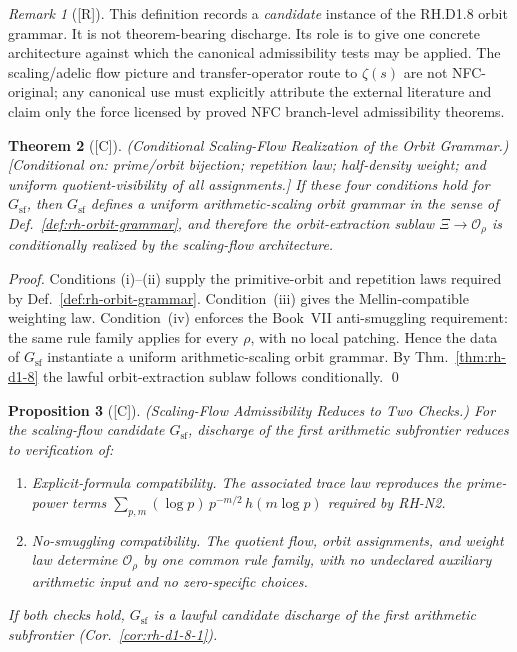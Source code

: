 \documentclass[12pt,oneside]{amsbook}
\theoremstyle{plain}
\newtheorem{theorem}{Theorem}[section]
\newtheorem{proposition}[theorem]{Proposition}
\theoremstyle{definition}
\theoremstyle{remark}
\newtheorem{remark}[theorem]{Remark}
\newcommand{\status}[1]{\textup{[#1]}}
\begin{document}
\begin{remark}[\status{R}]\label{rem:rh-sf-candidate-status}
This definition records a \emph{candidate} instance of the RH.D1.8
orbit grammar. It is not theorem-bearing discharge. Its role is to
give one concrete architecture against which the canonical
admissibility tests may be applied. The scaling/adelic flow picture
and transfer-operator route to $\zeta(s)$ are not NFC-original; any
canonical use must explicitly attribute the external literature and
claim only the force licensed by proved NFC branch-level admissibility
theorems.
\end{remark}

\begin{theorem}[\status{C}]\label{thm:rh-og-1}
\textup{(Conditional Scaling-Flow Realization of the Orbit Grammar.)}
\textup{[Conditional on: prime/orbit bijection; repetition law;
half-density weight; and uniform quotient-visibility of all
assignments.]}
If these four conditions hold for $G_{\mathrm{sf}}$, then
$G_{\mathrm{sf}}$ defines a uniform arithmetic-scaling orbit grammar in
the sense of Def.~\ref{def:rh-orbit-grammar}, and therefore the
orbit-extraction sublaw $\Xi \to \mathcal{O}_\rho$ is conditionally
realized by the scaling-flow architecture.
\end{theorem}

\begin{proof}
Conditions (i)--(ii) supply the primitive-orbit and repetition laws
required by Def.~\ref{def:rh-orbit-grammar}. Condition~(iii) gives
the Mellin-compatible weighting law. Condition~(iv) enforces the
Book~VII anti-smuggling requirement: the same rule family applies for
every $\rho$, with no local patching. Hence the data of $G_{\mathrm{sf}}$
instantiate a uniform arithmetic-scaling orbit grammar.
By Thm.~\ref{thm:rh-d1-8} the lawful orbit-extraction sublaw follows
conditionally. \qed
\end{proof}

\begin{proposition}[\status{C}]\label{prop:rh-og-2}
\textup{(Scaling-Flow Admissibility Reduces to Two Checks.)}
For the scaling-flow candidate $G_{\mathrm{sf}}$, discharge of the
first arithmetic subfrontier reduces to verification of:
\begin{enumerate}[label=\textup{(\arabic*)}]
 \item \emph{Explicit-formula compatibility.} The associated
 trace law reproduces the prime-power terms
 $\sum_{p,m} (\log p)\,p^{-m/2}\,h(m\log p)$ required by
 RH-N2.
 \item \emph{No-smuggling compatibility.} The quotient flow,
 orbit assignments, and weight law determine $\mathcal{O}_\rho$
 by one common rule family, with no undeclared auxiliary arithmetic
 input and no zero-specific choices.
\end{enumerate}
If both checks hold, $G_{\mathrm{sf}}$ is a lawful candidate discharge
of the first arithmetic subfrontier (Cor.~\ref{cor:rh-d1-8-1}).
\end{proposition}
\end{document}
